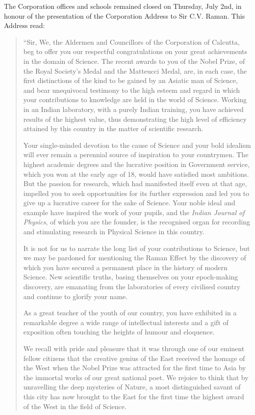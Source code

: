 The Corporation offices and schools remained closed on
Thursday, July 2nd, in honour of the presentation of the
Corporation Address to Sir C.V. Raman. This Address read:
\begin{quote}
{\fontsize{10pt}{12pt}\selectfont
``Sir, We, the Aldermen and Councillors of the Corporation
of Calcutta, beg to offer you our respectful congratulations on
your great achievements in the domain of Science. The recent
awards to you of the Nobel Prize, of the Royal Society's Medal
and the Matteucci Medal, are, in each case, the first distinctions
of the kind to be gained by an Asiatic man of Science, and bear
unequivocal testimony to the high esteem and regard in which your
contributions to knowledge are held in the world of Science.
Working in an Indian laboratory, with a purely Indian training,
you have achieved results of the highest value, thus demonstrating
the high level of efficiency attained by this country in the matter
of scientific research.

Your single-minded devotion to the cause of Science and your
bold idealism will ever remain a perennial source of inspiration
to your countrymen. The highest academic degrees and the
lucrative position in Government service, which you won at the
early age of 18, would have satisfied most ambitions. But the
passion for research, which had manifested itself even at that age,
impelled you to seek opportunities for its further expression and
led you to give up a lucrative career for the sake of Science. Your
noble ideal and example have inspired the work of your pupils,
and the {\em Indian Journal of Physics}, of which you are the founder,
is the recognised organ for recording and stimulating research in
Physical Science in this country.

It is not for us to narrate the long list of your contributions
to Science, but we may be pardoned for mentioning the Raman
Effect by the discovery of which you have secured a permanent
place in the history of modern Science. New scientific truths,
basing themselves on your epoch-making discovery, are emanating
from the laboratories of every civilised country and continue to
glorify your name.

As a great teacher of the youth of our country, you have
exhibited in a remarkable degree a wide range of intellectual
interests and a gift of exposition often touching the heights of
humour and eloquence.


We recall with pride and pleasure that it was through one
of our eminent fellow citizens that the creative genius of the East
received the homage of the West when the Nobel Prize was
attracted for the first time to Asia by the immortal works of our
great national poet. We rejoice to think that by unravelling the
deep mysteries of Nature, a most distinguished savant of this city
has now brought to the East for the first time the highest award
of the West in the field of Science.

}
\end{quote}

